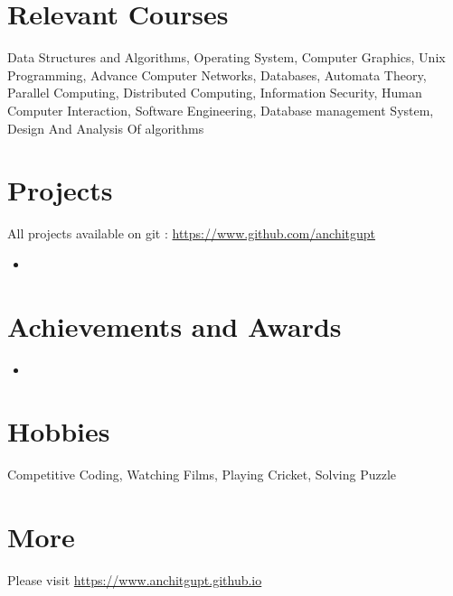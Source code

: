 \documentclass[margin, centered]{res}
\begin{document}
\begin{resume}
\section{Relevant \hspace{2mm} Courses}
Data Structures and Algorithms, Operating System, Computer Graphics, Unix Programming, Advance Computer Networks, Databases, Automata Theory, Parallel Computing, Distributed Computing, Information Security, Human Computer Interaction, Software Engineering, Database management System, Design And Analysis Of algorithms


\section{Projects}
All projects available on git : \url{https://www.github.com/anchitgupt}
\begin{itemize}[leftmargin=*]
 \item 
\end{itemize}




\section{Achievements and Awards}
\begin{itemize}[leftmargin=*]
 \item
\end{itemize}


\section{Hobbies}
Competitive Coding, Watching Films, Playing Cricket, Solving Puzzle

\section{More}
Please visit \href{https://www.anchitgupt.github.io}{https://www.anchitgupt.github.io}

\end{resume}
\end{document}
